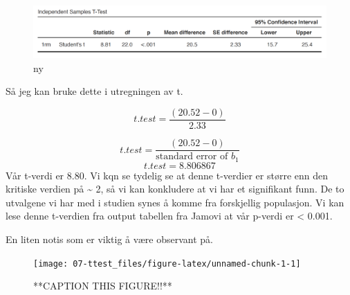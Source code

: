 \documentclass[
]{book}
\begin{document}
\begin{figure}
\centering
\includegraphics{output.png}
\caption{ny}
\end{figure}

Så jeg kan bruke dette i utregningen av t.

\[
t.test = \frac{(20.52 - 0)}{2.33}
\]

\[
t.test = \frac{(20.52 - 0)}{\text{standard error of } b_1}
\]
\[
t.test = 8.806867
\]
Vår t-verdi er 8.80. Vi kqn se tydelig se at denne t-verdier er større enn den kritiske verdien på \textasciitilde{} 2, så vi kan konkludere at vi har et signifikant funn. De to utvalgene vi har med i studien synes å komme fra forskjellig populasjon. Vi kan lese denne t-verdien fra output tabellen fra Jamovi at vår p-verdi er \textless{} 0.001.

En liten notis som er viktig å være observant på.

\begin{figure}

{\centering \texttt{[image: 07-ttest\_files/figure-latex/unnamed-chunk-1-1]} 

}

\caption{**CAPTION THIS FIGURE!!**}\label{fig:unnamed-chunk-1}
\end{figure}

  
\end{document}
